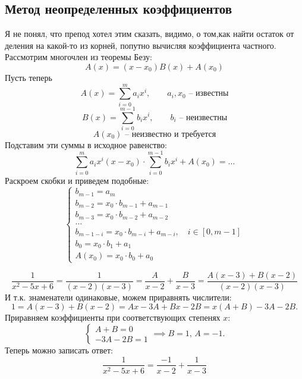 \documentclass[12pt, a4paper]{article}
\begin{document}
    \subsection{Метод неопределенных коэффициентов}
    \begin{exmp}
        Я не понял, что препод хотел этим сказать, видимо, о том,как найти остаток от деления на какой-то из корней, попутно вычисляя коэффициента частного.
        Рассмотрим многочлен из теоремы Безу: \[
            A(x) = (x - x_{0})B(x) + A(x_{0})
        \] 
        Пусть теперь \[
            A(x) = \sum_{i=0}^{m} a_{i}x^{i}, \qquad a_i, x_0\text{ -- известны} 
        \] 
        \[
            B(x) = \sum_{i=0}^{m-1} b_{i}x^{i}, \qquad b_{i} \text{ -- неизвестны}  
        \] 
        \[
            A(x_{0}) \text{ -- неизвестно и требуется}
        \] Подставим эти суммы в исходное равенство: \[
            \sum_{i=0}^{m} a_{i}x^{i}(x - x_{0})  \cdot  \sum_{i=0}^{m-1} b_{i}x^{i} + A(x_{0}) = \ldots  
        \] Раскроем скобки и приведем подобные: \[
            \begin{cases}
                b_{m-1} = a_{m}\\
                b_{m-2}=x_{0} \cdot b_{m-1} + a_{m-1}\\
                b_{m-3} =x_{0} \cdot b_{m-2} +a_{m-2}\\
                \ldots \\
                b_{m-1-i} = x_{0} \cdot b_{m-i} + a_{m-i}, \quad i \in [0, m-1]\\
                b_{0}= x_{0}\cdot b_{1} + a_{1}\\
                A(x_{0}) =x_{0}\cdot b_{0} + a_{0}
            \end{cases}
        \]  
        
    \end{exmp}
    \begin{exmp}
        \[
            \frac{1}{x^2 - 5x + 6} = \frac{1}{(x-2)(x-3)} = \frac{A}{x-2} + \frac{B}{x-3} = \frac{A(x-3) + B(x-2)}{(x-2)(x-3)}
        \] И т.к. знаменатели одинаковые, можем приравнять числители: \[
            1 = A(x-3) + B(x-2) = Ax - 3A  + Bx - 2B = x(A + B) - 3A - 2B.
        \] Приравняем коэффициенты при соответствующих степенях \( x \): \[
            \begin{cases}
                A + B = 0 \\
                -3A - 2B = 1
            \end{cases} \implies B = 1, \, A = -1.
        \] Теперь можно записать ответ: \[
            \frac{1}{x^2 - 5x + 6} = \frac{-1}{x-2} + \frac{1}{x-3}
        \] 
        
    \end{exmp}
\end{document}
